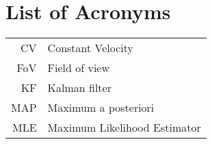 \chapter{List of Acronyms}

\begin{tabular}{rl}
CV & Constant Velocity \\
FoV & Field of view \\
KF & Kalman filter \\
MAP & Maximum a posteriori \\
MLE & Maximum Likelihood Estimator \\
\end{tabular}
